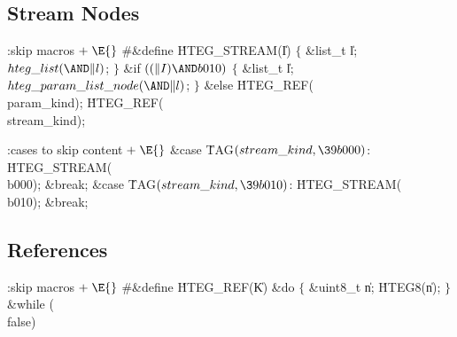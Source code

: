 


\subsection{Stream Nodes}
\Y\B\4:skip macros\X${}\mathrel+\E{}$\6
\8\#\&{define} \.{HTEG\_STREAM}(\|I)\1\6
\4${}\{{}$\5
\&{list\_t} \|l;\5
${}\index{hteg list+\\{hteg\_list}}\\{hteg\_list}({\AND}\|l){}$;\5
${}\}{}$\2\7
\&{if} ${}((\|I)\AND\\{b010}){}$\5
\1${}\{{}$\5
\&{list\_t} \|l;\5
${}\index{hteg param list node+\\{hteg\_param\_list\_node}}\\{hteg\_param\_list\_node}({\AND}\|l){}$;\5
${}\}{}$\5
\2\&{else}\1\5
\.{HTEG\_REF}(\\{param\_kind});\2\6
\.{HTEG\_REF}(\\{stream\_kind});
\Y
\fi


\Y\B\4:cases to skip content\X${}\mathrel+\E{}$\6
\4\&{case} \.{TAG}${}(\index{stream kind+\\{stream\_kind}}\\{stream\_kind},\39\\{b000}){}$:\5
\.{HTEG\_STREAM}(\\{b000});\5
\&{break};\6
\4\&{case} \.{TAG}${}(\index{stream kind+\\{stream\_kind}}\\{stream\_kind},\39\\{b010}){}$:\5
\.{HTEG\_STREAM}(\\{b010});\5
\&{break};
\Y
\fi




\subsection{References}
\noindent
\Y\B\4:skip macros\X${}\mathrel+\E{}$\6
\8\#\&{define} \.{HTEG\_REF}(\|K) \&{do}\5
\1${}\{{}$\5
\&{uint8\_t} \|n;\5
\.{HTEG8}(\|n);\5
${}\}{}$\5
\2\&{while} (\\{false})
\Y
\fi

